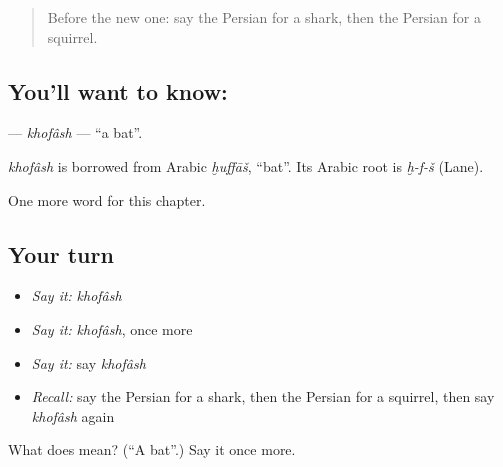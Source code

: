 \begin{quote}
Before the new one: say the Persian for a shark, then the Persian for a squirrel.
\end{quote}

\subsection*{You'll want to know: }
\textbf{} — \emph{khofâsh} — \textquotedblleft{}a bat\textquotedblright{}.

\begin{cousinweb}
\emph{khofâsh} is borrowed from Arabic \emph{ḫuffāš}, \textquotedblleft{}bat\textquotedblright{}. Its Arabic root is \emph{ḫ-f-š} (Lane).
\end{cousinweb}

\begin{grammarlens}[title={What you've built}]
One more word for this chapter.
\end{grammarlens}

\subsection*{Your turn}
\begin{itemize}
\raggedright
  \item \emph{Say it:} \emph{khofâsh}
  \item \emph{Say it:} \emph{khofâsh}, once more
  \item \emph{Say it:} say \emph{khofâsh}
  \item \emph{Recall:} say the Persian for a shark, then the Persian for a squirrel, then say \emph{khofâsh} again
\end{itemize}

\begin{tcolorbox}[breakable,colback=teal!4,colframe=teal!35!black,title={Before you move on}]
What does  mean? (\textquotedblleft{}A bat\textquotedblright{}.) Say it once more.
\end{tcolorbox}

